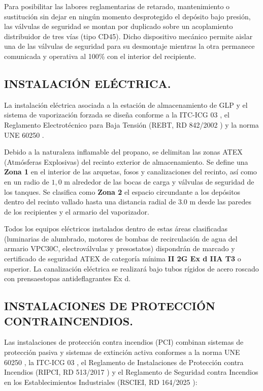 \documentclass[12pt]{article}
\begin{document}
            Para posibilitar las labores reglamentarias de retarado, mantenimiento o sustitución sin dejar en ningún momento desprotegido el depósito bajo presión, las válvulas de seguridad se montan por duplicado sobre un acoplamiento distribuidor de tres vías (tipo CD45). Dicho dispositivo mecánico permite aislar una de las válvulas de seguridad para su desmontaje mientras la otra permanece comunicada y operativa al 100\% con el interior del recipiente.
        
        \clearpage
        \subsection{INSTALACIÓN ELÉCTRICA.}
        La instalación eléctrica asociada a la estación de almacenamiento de GLP y el sistema de vaporización forzada se diseña conforme a la ITC-ICG 03 \cite{rd919}, el Reglamento Electrotécnico para Baja Tensión (REBT, RD 842/2002 \cite{rd842}) y la norma UNE 60250 \cite{une60250}.
        
        Debido a la naturaleza inflamable del propano, se delimitan las zonas ATEX (Atmósferas Explosivas) del recinto exterior de almacenamiento. Se define una \textbf{Zona 1} en el interior de las arquetas, fosos y canalizaciones del recinto, así como en un radio de $1,0\text{ m}$ alrededor de las bocas de carga y válvulas de seguridad de los tanques. Se clasifica como \textbf{Zona 2} el espacio circundante a los depósitos dentro del recinto vallado hasta una distancia radial de $3.0\text{ m}$ desde las paredes de los recipientes y el armario del vaporizador.
        
        Todos los equipos eléctricos instalados dentro de estas áreas clasificadas (luminarias de alumbrado, motores de bombas de recirculación de agua del armario VPC30C, electroválvulas y presostatos) dispondrán de marcado y certificado de seguridad ATEX de categoría mínima \textbf{II 2G Ex d IIA T3} o superior. La canalización eléctrica se realizará bajo tubos rígidos de acero roscado con prensaestopas antideflagrantes Ex d.
        
        \subsection{INSTALACIONES DE PROTECCIÓN CONTRAINCENDIOS.}
        Las instalaciones de protección contra incendios (PCI) combinan sistemas de protección pasiva y sistemas de extinción activa conformes a la norma UNE 60250 \cite{une60250}, la ITC-ICG 03 \cite{rd919}, el Reglamento de Instalaciones de Protección contra Incendios (RIPCI, RD 513/2017 \cite{rd513}) y el Reglamento de Seguridad contra Incendios en los Establecimientos Industriales (RSCIEI, RD 164/2025 \cite{rd164}):
        
\end{document}
